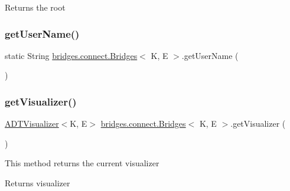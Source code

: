 \begin{DoxyReturn}{Returns}
the root 
\end{DoxyReturn}
\hypertarget{classbridges_1_1connect_1_1_bridges_a5ff3fdd97d4c71c9c2141c3355e417aa}{}\label{classbridges_1_1connect_1_1_bridges_a5ff3fdd97d4c71c9c2141c3355e417aa} 
\subsubsection{\texorpdfstring{get\+User\+Name()}{getUserName()}}
{\footnotesize\ttfamily static String \hyperlink{classbridges_1_1connect_1_1_bridges}{bridges.\+connect.\+Bridges}$<$ K, E $>$.get\+User\+Name (\begin{DoxyParamCaption}{ }\end{DoxyParamCaption})\hspace{0.3cm}{\ttfamily [static]}}

\hypertarget{classbridges_1_1connect_1_1_bridges_a7193b48c9dc01b04dfcf0d66fa2f59fb}{}\label{classbridges_1_1connect_1_1_bridges_a7193b48c9dc01b04dfcf0d66fa2f59fb} 
\subsubsection{\texorpdfstring{get\+Visualizer()}{getVisualizer()}}
{\footnotesize\ttfamily \hyperlink{classbridges_1_1base_1_1_a_d_t_visualizer}{A\+D\+T\+Visualizer}$<$K, E$>$ \hyperlink{classbridges_1_1connect_1_1_bridges}{bridges.\+connect.\+Bridges}$<$ K, E $>$.get\+Visualizer (\begin{DoxyParamCaption}{ }\end{DoxyParamCaption})}

This method returns the current visualizer \begin{DoxyReturn}{Returns}
visualizer 
\end{DoxyReturn}
\hypertarget{classbridges_1_1connect_1_1_bridges_a24c91901a59ab8b715a864ab8a4d9cdc}{}\label{classbridges_1_1connect_1_1_bridges_a24c91901a59ab8b715a864ab8a4d9cdc} 
